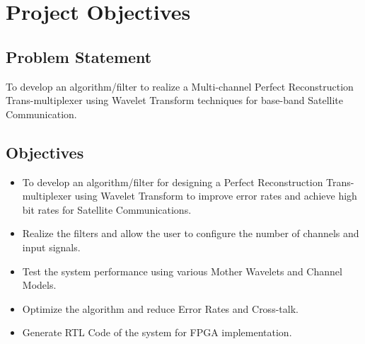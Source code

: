 \chapter{Project Objectives}
\section{Problem Statement}
To develop an algorithm/filter to realize a Multi-channel Perfect Reconstruction Trans-multiplexer using Wavelet Transform techniques for base-band Satellite Communication.
\section{Objectives}
\begin{itemize}
\item To develop an algorithm/filter for designing a Perfect Reconstruction Trans-multiplexer using Wavelet Transform to improve error rates and achieve high bit rates for Satellite Communications.
\item Realize the filters and allow the user to configure the number of channels and input signals.
\item Test the system performance using various Mother Wavelets and Channel Models.
\item Optimize the algorithm and reduce Error Rates and Cross-talk.
\item Generate RTL Code of the system for FPGA implementation.
\end{itemize}